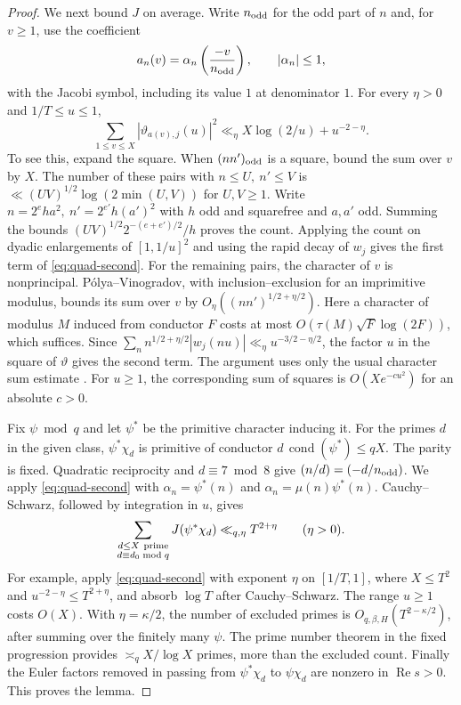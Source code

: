 \documentclass[11pt,reqno]{amsart}
\theoremstyle{definition}
\numberwithin{equation}{section}
\newcommand{\re}{\operatorname{Re}}
\begin{document}
\begin{proof}
We next bound \(J\) on average. Write \(n_{\rm odd}\) for the odd part
of \(n\) and, for \(v\ge1\), use the coefficient
\[
 a_n(v)=\alpha_n\left(\frac{-v}{n_{\rm odd}}\right),\qquad
 |\alpha_n|\le1,
\]
with the Jacobi symbol, including its value \(1\) at denominator \(1\).
For every \(\eta>0\) and \(1/T\le u\le1\),
\begin{equation}\label{eq:quad-second}
 \sum_{1\le v\le X}|\vartheta_{a(v),j}(u)|^2
   \ll_\eta X\log(2/u)+u^{-2-\eta}.
\end{equation}
To see this, expand the square. When \((nn')_{\rm odd}\) is a square,
bound the sum over \(v\) by \(X\). The number of these pairs with
\(n\le U,\ n'\le V\) is
\(\ll (UV)^{1/2}\log(2\min(U,V))\) for \(U,V\ge1\). Write
\(n=2^e h a^2,\ n'=2^{e'}h (a')^2\) with \(h\) odd and squarefree and
\(a,a'\) odd. Summing the bounds
\((UV)^{1/2}2^{-(e+e')/2}/h\) proves the count. Applying the count on
dyadic enlargements of \([1,1/u]^2\) and using the rapid decay of \(w_j\)
gives the first term of \eqref{eq:quad-second}.
For the remaining pairs, the character of \(v\) is nonprincipal.
P\'olya--Vinogradov, with inclusion--exclusion for an imprimitive modulus,
bounds its sum over \(v\) by \(O_\eta((nn')^{1/2+\eta/2})\).
Here a character of modulus \(M\) induced from conductor \(F\) costs at
most \(O(\tau(M)\sqrt{F}\log(2F))\), which suffices.
Since
\(\sum_n n^{1/2+\eta/2}|w_j(nu)|\ll_\eta u^{-3/2-\eta/2}\),
the factor \(u\) in the square of \(\vartheta\) gives the second term.
The argument uses only the usual character sum estimate
\cite[Ch.~9]{mv}. For \(u\ge1\), the corresponding sum of squares is
\(O(X e^{-c u^2})\) for an absolute \(c>0\).

Fix \(\psi\bmod q\) and let \(\psi^*\) be the primitive character inducing
it. For the primes \(d\) in the given class, \(\psi^*\chi_d\) is primitive
of conductor \(d\,\operatorname{cond}(\psi^*)\le qX\). The parity is fixed.
Quadratic reciprocity and \(d\equiv7\bmod8\) give
\((n/d)=(-d/n_{\rm odd})\). We apply \eqref{eq:quad-second} with
\(\alpha_n=\psi^*(n)\) and \(\alpha_n=\mu(n)\psi^*(n)\).
Cauchy--Schwarz, followed by integration in \(u\), gives
\[
 \sum_{\substack{d\le X\ {\rm prime}\\d\equiv d_0\bmod q}}
                     J(\psi^*\chi_d)\ll_{q,\eta} T^{2+\eta}
 \qquad(\eta>0).
\]
For example, apply \eqref{eq:quad-second} with exponent \(\eta\) on
\([1/T,1]\), where \(X\le T^2\) and \(u^{-2-\eta}\le T^{2+\eta}\),
and absorb \(\log T\) after Cauchy--Schwarz. The range \(u\ge1\) costs
\(O(X)\). With \(\eta=\kappa/2\), the number of excluded primes is
\(O_{q,\beta,H}(T^{2-\kappa/2})\), after summing over the finitely many
\(\psi\). The prime number theorem in the fixed progression provides
\(\asymp_q X/\log X\) primes, more than the excluded count. Finally the
Euler factors removed in passing from \(\psi^*\chi_d\) to
\(\psi\chi_d\) are nonzero in \(\re s>0\). This proves the lemma.
\end{proof}
\end{document}

